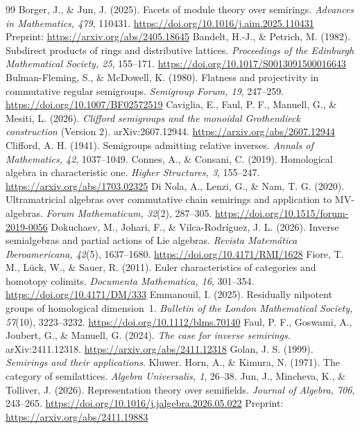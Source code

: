 \documentclass[11pt]{amsart}
\theoremstyle{definition}
\theoremstyle{remark}
\begin{document}
\begin{thebibliography}{99}
 Borger, J., \& Jun, J. (2025). Facets of module theory over semirings. \emph{Advances in Mathematics, 479}, 110431. \url{https://doi.org/10.1016/j.aim.2025.110431} Preprint: \url{https://arxiv.org/abs/2405.18645}
 Bandelt, H.-J., \& Petrich, M. (1982). Subdirect products of rings and distributive lattices. \emph{Proceedings of the Edinburgh Mathematical Society, 25}, 155--171. \url{https://doi.org/10.1017/S0013091500016643}
 Bulman-Fleming, S., \& McDowell, K. (1980). Flatness and projectivity in commutative regular semigroups. \emph{Semigroup Forum, 19}, 247--259. \url{https://doi.org/10.1007/BF02572519}
 Caviglia, E., Faul, P. F., Manuell, G., \& Mesiti, L. (2026). \emph{Clifford semigroups and the monoidal Grothendieck construction} (Version 2). arXiv:2607.12944. \url{https://arxiv.org/abs/2607.12944}
 Clifford, A. H. (1941). Semigroups admitting relative inverses. \emph{Annals of Mathematics, 42}, 1037--1049.
 Connes, A., \& Consani, C. (2019). Homological algebra in characteristic one. \emph{Higher Structures, 3}, 155--247. \url{https://arxiv.org/abs/1703.02325}
 Di Nola, A., Lenzi, G., \& Nam, T. G. (2020). Ultramatricial algebras over commutative chain semirings and application to MV-algebras. \emph{Forum Mathematicum, 32}(2), 287--305. \url{https://doi.org/10.1515/forum-2019-0056}
 Dokuchaev, M., Johari, F., \& Vilca-Rodr\'iguez, J. L. (2026). Inverse semialgebras and partial actions of Lie algebras. \emph{Revista Matem\'atica Iberoamericana, 42}(5), 1637--1680. \url{https://doi.org/10.4171/RMI/1628}
 Fiore, T. M., L\"uck, W., \& Sauer, R. (2011). Euler characteristics of categories and homotopy colimits. \emph{Documenta Mathematica, 16}, 301--354. \url{https://doi.org/10.4171/DM/333}
 Emmanouil, I. (2025). Residually nilpotent groups of homological dimension~1. \emph{Bulletin of the London Mathematical Society, 57}(10), 3223--3232. \url{https://doi.org/10.1112/blms.70140}
 Faul, P. F., Goswami, A., Joubert, G., \& Manuell, G. (2024). \emph{The case for inverse semirings}. arXiv:2411.12318. \url{https://arxiv.org/abs/2411.12318}
 Golan, J. S. (1999). \emph{Semirings and their applications}. Kluwer.
 Horn, A., \& Kimura, N. (1971). The category of semilattices. \emph{Algebra Universalis, 1}, 26--38.
 Jun, J., Mincheva, K., \& Tolliver, J. (2026). Representation theory over semifields. \emph{Journal of Algebra, 706}, 243--265. \url{https://doi.org/10.1016/j.jalgebra.2026.05.022} Preprint: \url{https://arxiv.org/abs/2411.19883}

\end{thebibliography}
\end{document}
